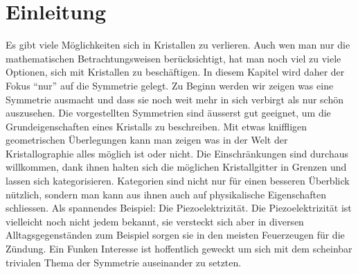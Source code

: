 \section{Einleitung}
Es gibt viele Möglichkeiten sich in Kristallen zu verlieren.
Auch wen man nur die mathematischen Betrachtungsweisen berücksichtigt, hat man noch viel zu viele Optionen, sich mit Kristallen zu beschäftigen.
In diesem Kapitel wird daher der Fokus ``nur'' auf die Symmetrie gelegt.
Zu Beginn werden wir zeigen was eine Symmetrie ausmacht und dass sie noch weit mehr in sich verbirgt als nur schön auszusehen.
Die vorgestellten Symmetrien sind äusserst gut geeignet, um die Grundeigenschaften eines Kristalls zu beschreiben.
Mit etwas kniffligen geometrischen Überlegungen kann man zeigen was in der Welt der Kristallographie alles möglich ist oder nicht.
Die Einschränkungen sind durchaus willkommen, dank ihnen halten sich die möglichen Kristallgitter in Grenzen und lassen sich kategorisieren. 
Kategorien sind nicht nur für einen besseren Überblick nützlich, sondern man kann aus ihnen auch auf physikalische Eigenschaften schliessen. Als spannendes Beispiel: Die Piezoelektrizität.
Die Piezoelektrizität ist vielleicht noch nicht jedem bekannt, sie versteckt sich aber in diversen Alltagsgegenständen zum Beispiel sorgen sie in den meisten Feuerzeugen für die Zündung.
Ein Funken Interesse ist hoffentlich geweckt um sich mit dem scheinbar trivialen Thema der Symmetrie auseinander zu setzten.

